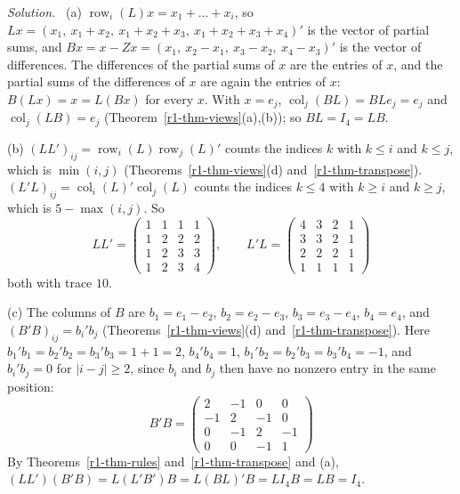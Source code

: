 \documentclass[12pt]{article}
\DeclareMathOperator{\row}{row}
\DeclareMathOperator{\col}{col}
\theoremstyle{definition}
\newenvironment{solution}{\par\noindent\textit{Solution.}\ }{\par\smallskip}
\begin{document}
\begin{solution}
(a) \(\row_i(L)x=x_1+\dots+x_i\), so \(Lx=(x_1,\ x_1+x_2,\ x_1+x_2+x_3,\ x_1+x_2+x_3+x_4)'\)
is the vector of partial sums, and \(Bx=x-Zx=(x_1,\ x_2-x_1,\ x_3-x_2,\ x_4-x_3)'\) is the
vector of differences. The differences of the partial sums of \(x\) are the entries of \(x\),
and the partial sums of the differences of \(x\) are again the entries of \(x\):
\(B(Lx)=x=L(Bx)\) for every \(x\). With \(x=e_j\), \(\col_j(BL)=BLe_j=e_j\) and
\(\col_j(LB)=e_j\) (Theorem~\ref{r1-thm-views}(a),(b)); so \(BL=I_4=LB\).

(b) \((LL')_{ij}=\row_i(L)\row_j(L)'\) counts the indices \(k\) with \(k\leqslant i\) and
\(k\leqslant j\), which is \(\min(i,j)\) (Theorems~\ref{r1-thm-views}(d) and~\ref{r1-thm-transpose}). \((L'L)_{ij}=\col_i(L)'\col_j(L)\) counts the
indices \(k\leqslant4\) with \(k\geqslant i\) and \(k\geqslant j\), which is \(5-\max(i,j)\).
So
\[
LL'=\begin{pmatrix}1&1&1&1\\1&2&2&2\\1&2&3&3\\1&2&3&4\end{pmatrix},\qquad
L'L=\begin{pmatrix}4&3&2&1\\3&3&2&1\\2&2&2&1\\1&1&1&1\end{pmatrix}
\]
both with trace \(10\).

(c) The columns of \(B\) are \(b_1=e_1-e_2\), \(b_2=e_2-e_3\), \(b_3=e_3-e_4\), \(b_4=e_4\),
and \((B'B)_{ij}=b_i'b_j\) (Theorems~\ref{r1-thm-views}(d) and~\ref{r1-thm-transpose}). Here
\(b_1'b_1=b_2'b_2=b_3'b_3=1+1=2\), \(b_4'b_4=1\), \(b_1'b_2=b_2'b_3=b_3'b_4=-1\), and
\(b_i'b_j=0\) for \(|i-j|\geqslant2\), since \(b_i\) and \(b_j\) then have no nonzero entry in
the same position:
\[
B'B=\begin{pmatrix}2&-1&0&0\\-1&2&-1&0\\0&-1&2&-1\\0&0&-1&1\end{pmatrix}
\]
By Theorems~\ref{r1-thm-rules} and~\ref{r1-thm-transpose} and (a),
\((LL')(B'B)=L(L'B')B=L(BL)'B=LI_4B=LB=I_4\).
\end{solution}
\end{document}
